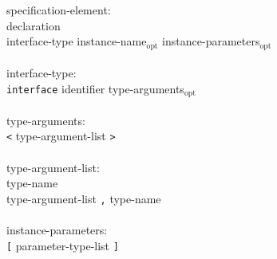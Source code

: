 \documentclass[11pt,letterpaper]{article}
\newcommand{\kw}[1]{{\tt #1}}
\newcommand{\opt}{$_{\mbox{opt}}$\xspace}
\begin{document}
\begin{tabbing}
specification-element:\\
\>	declaration\\
\>	interface-type instance-name\opt instance-parameters\opt\\
\\
interface-type:\\
\>	\kw{interface} identifier type-arguments\opt\\
\\
type-arguments:\\
\>	\kw{<} type-argument-list \kw{>}\\
\\
type-argument-list:\\
\>	type-name\\
\>	type-argument-list \kw{,} type-name\\
\\
instance-parameters:\\
\>	\kw{[} parameter-type-list \kw{]}
\end{tabbing} \rm
\end{document}
